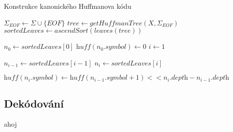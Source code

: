 \documentclass[a4paper, 11pt, fleqn]{scrartcl}
\begin{document}
        \begin{algorithm}[!h]
          \SetAlgoLined
          \DontPrintSemicolon
          \caption{Konstrukce kanonického Huffmanova kódu}
          \vspace*{2mm}

          $\Sigma_{EOF} \leftarrow \Sigma \cup \{\textit{EOF}\}$\;
          $\textit{tree} \leftarrow \textit{getHuffmanTree}(X, \Sigma_{EOF})$\;
          $\textit{sortedLeaves} \leftarrow \textit{ascendSort}(\textit{leaves}(\textit{tree}))$

          $n_0 \leftarrow \textit{sortedLeaves}[0]$\;
          $\textit{huff}(n_0.symbol) \leftarrow 0$\;
          $i \leftarrow 1$\;
          {
            $n_{i-1} \leftarrow \textit{sortedLeaves}[i-1]$\;
            $n_i \leftarrow \textit{sortedLeaves}[i]$\;

            $\textit{huff}(n_i.symbol) \leftarrow \textit{huff}(n_{i-1}.symbol + 1) << n_i.\textit{depth} - n_{i-1}.\textit{depth}$\;
          }

        \end{algorithm}

      \subsection*{Dekódování}
        ahoj
\end{document}
